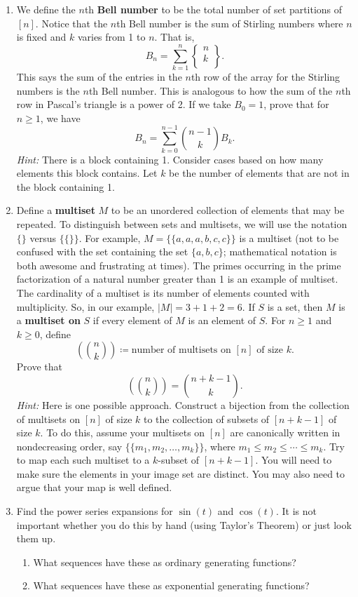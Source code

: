 \documentclass[11pt]{article}%
\theoremstyle{definition}
\newcommand{\stirling}[2]{
  \displaystyle \left\{\begin{matrix}#1  \\#2  \\ \end{matrix}\right\}}
\begin{document}
\begin{enumerate}
\item We define the $n$th \textbf{Bell number} to be the total number of set partitions of $[n]$.  Notice that the $n$th Bell number is the sum of Stirling numbers where $n$ is fixed and $k$ varies from 1 to $n$.  That is,
\[
B_n=\sum_{k=1}^n\stirling{n}{k}.
\]
This says the sum of the entries in the $n$th row of the array for the Stirling numbers is the $n$th Bell number.  This is analogous to how the sum of the $n$th row in Pascal's triangle is a power of 2. If we take $B_0=1$, prove that for $n\geq 1$, we have
\[
B_n=\sum_{k=0}^{n-1}\binom{n-1}{k}B_k.
\]
\emph{Hint:} There is a block containing 1. Consider cases based on how many elements this block contains. Let $k$ be the number of elements that are not in the block containing 1.
\item Define a \textbf{multiset} $M$ to be an unordered collection of elements that may be repeated.  To distinguish between sets and multisets, we will use the notation $\{\}$ versus $\{\{\}\}$. For example, $M=\{\{a,a,a,b,c,c\}\}$ is a multiset (not to be confused with the set containing the set $\{a,b,c\}$; mathematical notation is both awesome and frustrating at times). The primes occurring in the prime factorization of a natural number greater than 1 is an example of multiset.  The cardinality of a multiset is its number of elements counted with multiplicity.  So, in our example, $|M|=3+1+2=6$.  If $S$ is a set, then $M$ is a \textbf{multiset on} $S$ if every element of $M$ is an element of $S$. For $n\geq 1$ and $k\geq 0$, define
\[
\left(\binom{n}{k}\right)\coloneqq \text{number of multisets on }[n]\text{ of size }k.
\]
Prove that
\[
\left(\binom{n}{k}\right)=\binom{n+k-1}{k}.
\]
\emph{Hint:} Here is one possible approach.  Construct a bijection from the collection of multisets on $[n]$ of size $k$ to the collection of subsets of $[n+k-1]$ of size $k$. To do this, assume your multisets on $[n]$ are canonically written in nondecreasing order, say $\{\{m_1,m_2,\ldots,m_k\}\}$, where $m_1\leq m_2\leq \cdots \leq m_k$.  Try to map each such multiset to a $k$-subset of $[n+k-1]$.  You will need to make sure the elements in your image set are distinct.  You may also need to argue that your map is well defined.

\item Find the power series expansions for $\sin(t)$ and $\cos(t)$. It is not important whether you do this by hand (using Taylor's Theorem) or just look them up.  
\begin{enumerate}
\item What sequences have these as ordinary generating functions?
\item What sequences have these as exponential generating functions?
\end{enumerate}


\end{enumerate}
\end{document}
